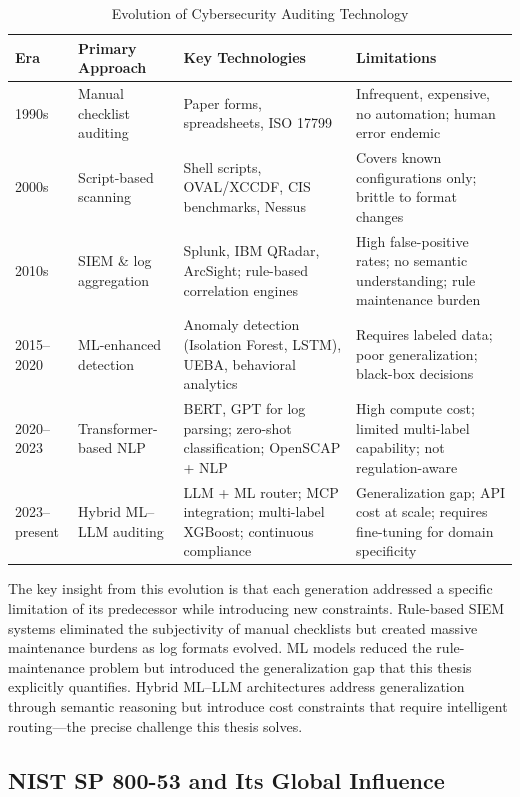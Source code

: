 \documentclass[12pt,oneside]{report}
\begin{document}
\begin{table}[H]
\centering
\caption{Evolution of Cybersecurity Auditing Technology}
\label{tab:tech_evolution}
\renewcommand{\arraystretch}{1.3}
\begin{tabularx}{\textwidth}{|l|X|X|X|}
\hline
\textbf{Era} & \textbf{Primary Approach} & \textbf{Key Technologies} & \textbf{Limitations} \\
\hline
1990s & Manual checklist auditing & Paper forms, spreadsheets, ISO 17799 & Infrequent, expensive, no automation; human error endemic \\
\hline
2000s & Script-based scanning & Shell scripts, OVAL/XCCDF, CIS benchmarks, Nessus & Covers known configurations only; brittle to format changes \\
\hline
2010s & SIEM \& log aggregation & Splunk, IBM QRadar, ArcSight; rule-based correlation engines & High false-positive rates; no semantic understanding; rule maintenance burden \\
\hline
2015–2020 & ML-enhanced detection & Anomaly detection (Isolation Forest, LSTM), UEBA, behavioral analytics & Requires labeled data; poor generalization; black-box decisions \\
\hline
2020–2023 & Transformer-based NLP & BERT, GPT for log parsing; zero-shot classification; OpenSCAP + NLP & High compute cost; limited multi-label capability; not regulation-aware \\
\hline
2023–present & Hybrid ML–LLM auditing & LLM + ML router; MCP integration; multi-label XGBoost; continuous compliance & Generalization gap; API cost at scale; requires fine-tuning for domain specificity \\
\hline
\end{tabularx}
\end{table}

The key insight from this evolution is that each generation addressed a specific limitation of its predecessor while introducing new constraints. Rule-based SIEM systems eliminated the subjectivity of manual checklists but created massive maintenance burdens as log formats evolved. ML models reduced the rule-maintenance problem but introduced the generalization gap that this thesis explicitly quantifies. Hybrid ML--LLM architectures address generalization through semantic reasoning but introduce cost constraints that require intelligent routing—the precise challenge this thesis solves.

\subsection{NIST SP 800-53 and Its Global Influence}
\end{document}

